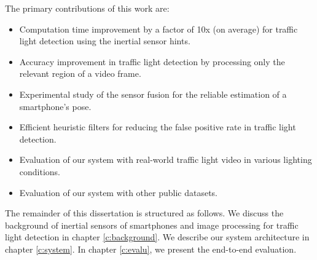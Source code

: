 The primary contributions of this work are:

\begin{itemize}
\item Computation time improvement by a factor of 10x (on average) for traffic light detection using the inertial sensor hints. 
\item Accuracy improvement in traffic light detection by processing only the relevant region of a video frame. 
\item Experimental study of the sensor fusion for the reliable estimation of a smartphone's pose. 
\item Efficient heuristic filters for reducing the false positive rate in traffic light detection.
\item Evaluation of our system with real-world traffic light video in various lighting conditions. 
\item Evaluation of our system with other public datasets.
  

\end{itemize}

The remainder of this dissertation is structured as follows.
We discuss the background of inertial sensors of smartphones and image processing for traffic light detection in chapter \ref{c:background}.
We describe our system architecture in chapter \ref{c:system}.
In chapter \ref{c:evalu}, we present the end-to-end evaluation.
